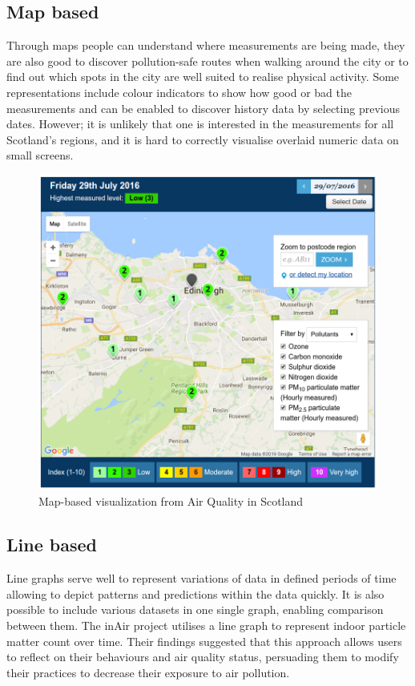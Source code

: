 \subsection{Map based}
Through maps people can understand where measurements are being made, they are also good to discover pollution-safe routes when walking around the city or to find out which spots in the city are well suited to realise physical activity.  Some representations include colour indicators to show how good or bad the measurements and can be enabled to discover history data by selecting previous dates. However; it is unlikely that one is interested in the measurements for all Scotland's regions, and it is hard to correctly visualise overlaid numeric data on small screens.

\begin{figure}[H]
\begin{adjustbox}{width=1\textwidth,center=\textwidth}
  \centering
  \includegraphics[scale=.30]{images/map_visualization.png}
\end{adjustbox}
  \caption[Map-based visualization]{Map-based visualization from Air Quality in Scotland \cite{Scottishairquality.co.uk2016}}
  \label{fig:web_based_desktop_visualization}
\end{figure}


\subsection{Line based}
Line graphs serve well to represent variations of data in defined periods of time allowing to depict patterns and predictions within the data quickly. It is also possible to include various datasets in one single graph, enabling comparison between them. The inAir project \cite{Kim2013} utilises a line graph to represent indoor particle matter count over time. Their findings suggested that this approach allows users to reflect on their behaviours and air quality status, persuading them to modify their practices to decrease their exposure to air pollution. 

